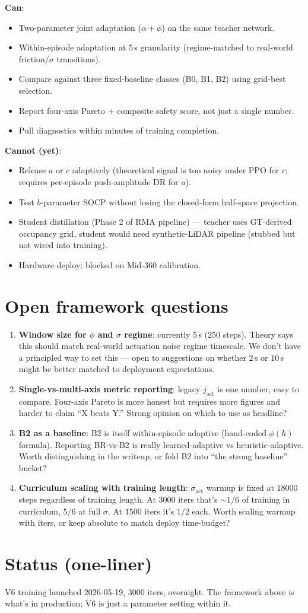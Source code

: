 \documentclass[11pt]{article}
\begin{document}
\textbf{Can}:
\begin{itemize}
\item Two-parameter joint adaptation ($\alpha + \phi$) on the same teacher network.
\item Within-episode adaptation at $5$\,s granularity (regime-matched to real-world friction/$\sigma$ transitions).
\item Compare against three fixed-baseline classes (B0, B1, B2) using grid-best selection.
\item Report four-axis Pareto + composite safety score, not just a single number.
\item Pull diagnostics within minutes of training completion.
\end{itemize}

\textbf{Cannot (yet)}:
\begin{itemize}
\item Release $a$ or $c$ adaptively (theoretical signal is too noisy under PPO for $c$; requires per-episode push-amplitude DR for $a$).
\item Test $b$-parameter SOCP without losing the closed-form half-space projection.
\item Student distillation (Phase 2 of RMA pipeline) — teacher uses GT-derived occupancy grid, student would need synthetic-LiDAR pipeline (stubbed but not wired into training).
\item Hardware deploy: blocked on Mid-360 calibration.
\end{itemize}

\section*{Open framework questions}

\begin{enumerate}
\item \textbf{Window size for $\phi$ and $\sigma$ regime}: currently $5$\,s ($250$ steps). Theory says this should match real-world actuation noise regime timescale. We don't have a principled way to set this — open to suggestions on whether $2$\,s or $10$\,s might be better matched to deployment expectations.
\item \textbf{Single-vs-multi-axis metric reporting}: legacy $j_\text{act}$ is one number, easy to compare. Four-axis Pareto is more honest but requires more figures and harder to claim ``X beats Y.'' Strong opinion on which to use as headline?
\item \textbf{B2 as a baseline}: B2 is itself within-episode adaptive (hand-coded $\phi(h)$ formula). Reporting BR-vs-B2 is really learned-adaptive vs heuristic-adaptive. Worth distinguishing in the writeup, or fold B2 into ``the strong baseline'' bucket?
\item \textbf{Curriculum scaling with training length}: $\sigma_\text{act}$ warmup is fixed at $18000$ steps regardless of training length. At $3000$ iters that's $\sim 1/6$ of training in curriculum, $5/6$ at full $\sigma$. At $1500$ iters it's $1/2$ each. Worth scaling warmup with iters, or keep absolute to match deploy time-budget?
\end{enumerate}

\section*{Status (one-liner)}

V6 training launched 2026-05-19, $3000$ iters, overnight. The framework above is what's in production; V6 is just a parameter setting within it.
\end{document}
